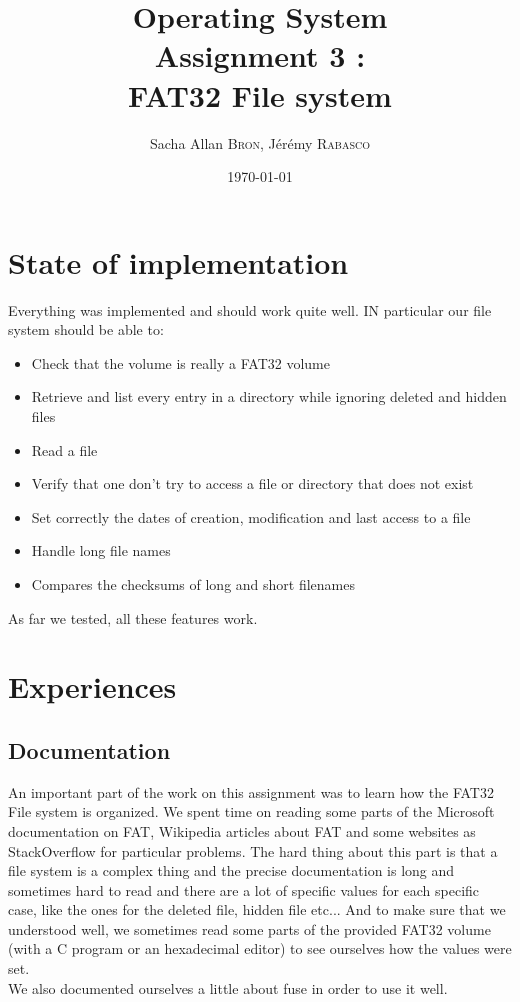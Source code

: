 \documentclass{article}
\title{Operating System\\Assignment 3 : \\ FAT32 File system} %
\author{Sacha Allan \textsc{Bron}, J\'er\'emy \textsc{Rabasco}} %
\date{\today} %
\begin{document}
\maketitle %




\section{State of implementation}
Everything was implemented and should work quite well. IN particular our file system should be able to:
\begin{itemize}
\item Check that the volume is really a FAT32 volume
\item Retrieve and list every entry in a directory while ignoring deleted and hidden files
\item Read a file
\item Verify that one don't try to access a file or directory that does not exist
\item Set correctly the dates of creation, modification and last access to a file
\item Handle long file names
\item Compares the checksums of long and short filenames
\end{itemize}

As far we tested, all these features work.
\section{Experiences}

\subsection{Documentation}

An important part of the work on this assignment was to learn how the FAT32 File system is organized. We spent time on reading some parts of the Microsoft documentation on FAT, Wikipedia articles about FAT and some websites as StackOverflow for particular problems. The hard thing about this part is that a file system is a complex thing and the precise documentation is long and sometimes hard to read and there are a lot of specific values for each specific case, like the ones for the deleted file, hidden file etc... And to make sure that we understood well, we sometimes read some parts of the provided FAT32 volume (with a C program or an hexadecimal editor) to see ourselves how the values were set.\\
We also documented ourselves a little about fuse in order to use it well.
\end{document}
